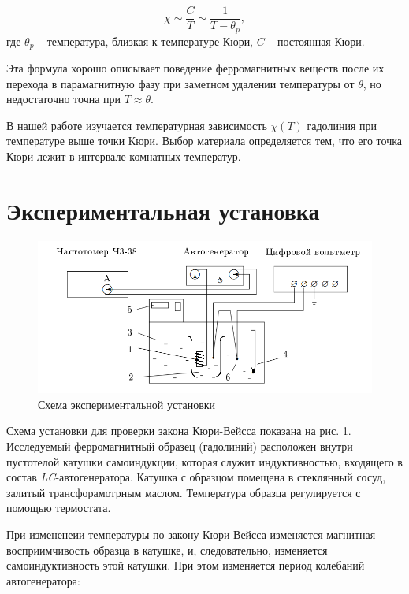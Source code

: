\documentclass[a4paper, 12pt]{article}
\begin{document}
\begin{equation}
\label{Кюри-Вейсс}
\chi\sim\frac{C}{T}\sim\frac{1}{T-\theta_p}, 
\end{equation}
где $\theta_p$ -- температура, близкая к температуре Кюри,
$C$ -- постоянная Кюри.

Эта формула хорошо описывает поведение ферромагнитных веществ после их перехода в парамагнитную фазу при заметном удалении температуры от $\theta$, но недостаточно точна при $T\approx\theta$.

В нашей работе изучается температурная зависимость $\chi(T)$ гадолиния при температуре выше точки Кюри. Выбор материала определяется тем, что его точка Кюри лежит в интервале комнатных температур.

\newpage

\section{Экспериментальная установка}

\begin{figure}[h]
\begin{center}
\includegraphics[width=1\textwidth]{Схема_установки}
\end{center}
\caption{Схема экспериментальной установки} \label{Установка}
\end{figure}

Схема установки для проверки закона Кюри-Вейсса показана на рис. \ref{Установка}. Исследуемый ферромагнитный образец (гадолиний) расположен внутри пустотелой катушки самоиндукции, которая служит индуктивностью, входящего в состав \textit{LC}-автогенератора. Катушка с образцом помещена в стеклянный сосуд, залитый трансфорамотрным маслом. Температура образца регулируется с помощью термостата.

При измененеии температуры по закону Кюри-Вейсса изменяется магнитная восприимчивость образца в катушке, и, следовательно, изменяется самоиндуктивность этой катушки. При этом изменяется период колебаний автогенератора:
\end{document}
